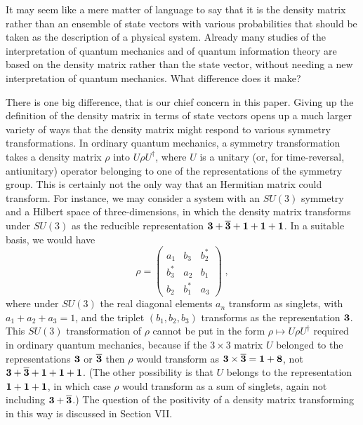 It may seem like a mere matter of language to say that it is the  density matrix rather than  an ensemble of state vectors with various probabilities that should be taken as the description of a physical system.  Already many studies of the interpretation of quantum mechanics and of quantum information theory are  based on the density matrix rather than the state vector, without needing a new interpretation of quantum mechanics.  What difference does it make?  

There is one big difference, that is our chief concern in this paper. Giving up the definition of the density matrix in terms of state vectors opens up a much larger variety of ways that the density matrix might respond to various symmetry transformations.  In ordinary quantum mechanics, a symmetry transformation takes a density matrix $\rho$ into $U\rho U^\dagger$, where $U$ is a unitary (or, for time-reversal, antiunitary) operator belonging to one of the representations of the symmetry group.  This is certainly not the only way that an Hermitian matrix could transform.    For instance, we may consider a system with an $SU(3)$ symmetry and  a Hilbert space of three-dimensions, in which the density matrix transforms under $SU(3)$ as the reducible representation ${\mbox{\boldmath{$3$}}}+\overline{\mbox{\boldmath{$3$}}}+{\mbox{\boldmath{$1$}}}+{\mbox{\boldmath{$1$}}}+{\mbox{\boldmath{$1$}}}$.  In a suitable basis, we would have
$$\rho=\left(\begin{array}{ccc}a_1 & b_3 & b_2^* \\ b_3^* & a_2 & b_1 \\ b_2 & b_1^* & a_3 \end{array}\right)\;,$$
where  under $SU(3)$ the real diagonal elements $a_n$ transform as singlets, with $a_1+a_2+a_3=1$, and the triplet $(b_1,b_2,b_3)$ transforms as the representation ${\mbox{\boldmath{$3$}}}$.
This $SU(3)$ transformation of $\rho$  cannot be put in the form $\rho\mapsto U\rho U^\dagger$ required in ordinary quantum mechanics, because if the $3\times 3$ matrix $U$  belonged to the representations ${\mbox{\boldmath{$3$}}}$ or $\overline{\mbox{\boldmath{$3$}}}$ then $\rho$ would transform as  ${\mbox{\boldmath{$3$}}}\times\overline{\mbox{\boldmath{$3$}}}= {\mbox{\boldmath{$1$}}}+{\mbox{\boldmath{$8$}}}$, not ${\mbox{\boldmath{$3$}}}+\overline{\mbox{\boldmath{$3$}}}+{\mbox{\boldmath{$1$}}}+{\mbox{\boldmath{$1$}}}+{\mbox{\boldmath{$1$}}}$.  (The other possibility is that $U$  belongs to the representation ${\mbox{\boldmath{$1$}}}+{\mbox{\boldmath{$1$}}}+{\mbox{\boldmath{$1$}}}$, in which case $\rho$ would transform as a sum of singlets, again not including ${\mbox{\boldmath{$3$}}}+\overline{\mbox{\boldmath{$3$}}}$.)  The question of the positivity of a density matrix transforming in this way is discussed in Section VII.

